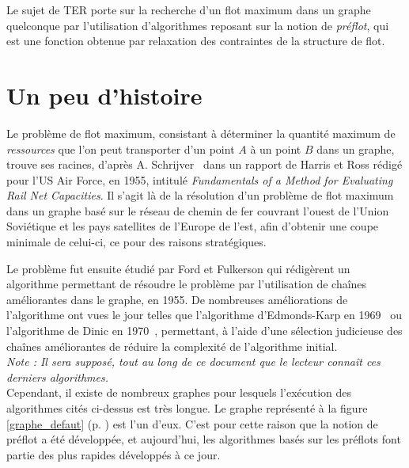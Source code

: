 
Le sujet de TER porte sur la recherche d'un flot maximum dans un graphe quelconque par
l'utilisation d'algorithmes reposant sur la notion de \emph{préflot}, qui est une fonction obtenue
par relaxation des contraintes de la structure de flot. \\

\section{Un peu d'histoire}

Le problème de flot maximum, consistant à déterminer la quantité maximum de \emph{ressources} que
l'on peut transporter d'un point $A$ à un point $B$ dans un graphe, trouve ses racines, d'après A. 
Schrijver~\cite{schrij02} dans un rapport de Harris et Ross rédigé pour l'US
Air Force, en 1955, intitulé \emph{Fundamentals of a Method for Evaluating Rail Net Capacities}.  Il
s'agit là de la résolution d'un problème de flot maximum dans un graphe basé sur le réseau de
chemin de fer couvrant l'ouest de l'Union Soviétique et les pays satellites de l'Europe de l'est,
afin d'obtenir une coupe minimale de celui-ci, ce pour des raisons stratégiques.

Le problème fut ensuite étudié par Ford et Fulkerson qui rédigèrent un algorithme permettant de
résoudre le problème par l'utilisation de chaînes améliorantes dans le graphe, en 1955. De
nombreuses améliorations de l'algorithme ont vues le jour telles que l'algorithme d'Edmonds-Karp en
1969~\cite{gold88} ou l'algorithme de Dinic en 1970~\cite{gold88}, permettant, à l'aide d'une sélection 
judicieuse des chaînes améliorantes de réduire la complexité de l'algorithme initial.\\

\emph{Note : Il sera supposé, tout au long de ce document que le lecteur connaît ces derniers
algorithmes.} \\


Cependant, il existe de nombreux graphes pour lesquels l'exécution des algorithmes cités
ci-dessus est très longue. Le graphe représenté à la figure \ref{graphe_defaut} (p.
\pageref{graphe_defaut}) est l'un d'eux. C'est pour cette raison que la notion de préflot a été
développée, et aujourd'hui, les algorithmes basés sur les préflots font partie des plus rapides
développés à ce jour.\\

